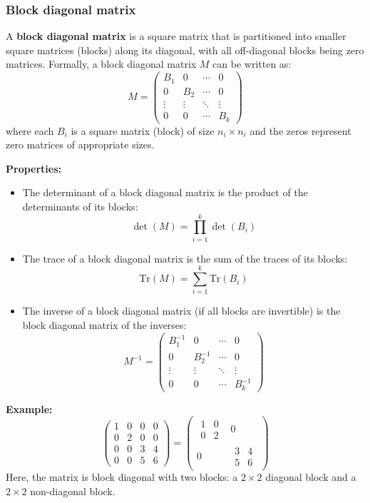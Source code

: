 \documentclass[11pt, a4paper]{report}
\begin{document}
\subsubsection{Block diagonal matrix}
A \textbf{block diagonal matrix} is a square matrix that is partitioned into smaller square matrices (blocks) along its diagonal, with all off-diagonal blocks being zero matrices. Formally, a block diagonal matrix $M$ can be written as:
$$
M = \begin{pmatrix}
B_1 & 0 & \cdots & 0 \\
0 & B_2 & \cdots & 0 \\
\vdots & \vdots & \ddots & \vdots \\
0 & 0 & \cdots & B_k
\end{pmatrix}
$$
where each $B_i$ is a square matrix (block) of size $n_i \times n_i$ and the zeros represent zero matrices of appropriate sizes.

\textbf{Properties:}
\begin{itemize}
    \item The determinant of a block diagonal matrix is the product of the determinants of its blocks:
    $$
    \det(M) = \prod_{i=1}^k \det(B_i)
    $$
    \item The trace of a block diagonal matrix is the sum of the traces of its blocks:
    $$
    \text{Tr}(M) = \sum_{i=1}^k \text{Tr}(B_i)
    $$
    \item The inverse of a block diagonal matrix (if all blocks are invertible) is the block diagonal matrix of the inverses:
    $$
    M^{-1} = \begin{pmatrix}
    B_1^{-1} & 0 & \cdots & 0 \\
    0 & B_2^{-1} & \cdots & 0 \\
    \vdots & \vdots & \ddots & \vdots \\
    0 & 0 & \cdots & B_k^{-1}
    \end{pmatrix}
    $$
\end{itemize}

\textbf{Example:}
$$
\begin{pmatrix}
1 & 0 & 0 & 0 \\
0 & 2 & 0 & 0 \\
0 & 0 & 3 & 4 \\
0 & 0 & 5 & 6
\end{pmatrix}
=\begin{pmatrix}
\begin{matrix}1 & 0 \\ 0 & 2\end{matrix} & 0 \\
0 & \begin{matrix}3 & 4 \\ 5 & 6\end{matrix}
\end{pmatrix}
$$
Here, the matrix is block diagonal with two blocks: a $2\times2$ diagonal block and a $2\times2$ non-diagonal block.
\end{document}
